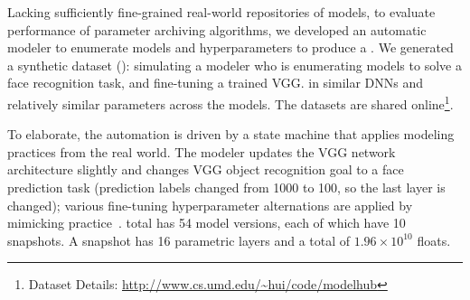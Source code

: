 \documentclass[conference]{IEEEtran}
\begin{document}
Lacking sufficiently fine-grained real-world repositories of models, 
to evaluate performance of parameter archiving algorithms, we developed an automatic modeler  to enumerate models and hyperparameters to produce a \dlv\repository. 
We generated a synthetic dataset (\syntheticds): simulating a modeler who is enumerating models to solve a face recognition task, and fine-tuning a trained VGG. \syntheticds\results in similar DNNs and relatively similar parameters across the models.
The datasets are shared online\footnote{Dataset Details: {\small{\url{http://www.cs.umd.edu/~hui/code/modelhub}}}}. 

To elaborate, the automation is driven by a state machine that applies modeling practices from the real world. The modeler updates the VGG network architecture slightly and changes VGG object recognition goal to a face prediction task (prediction labels changed from 1000 to 100, so the last layer is changed);  various fine-tuning hyperparameter alternations are applied by mimicking practice~\cite{fastrnn}.   \syntheticds\in total has 54 model versions, each of which have 10 snapshots. A snapshot has 16 parametric layers and a total of $1.96\times10^{10}$ floats.
\end{document}
